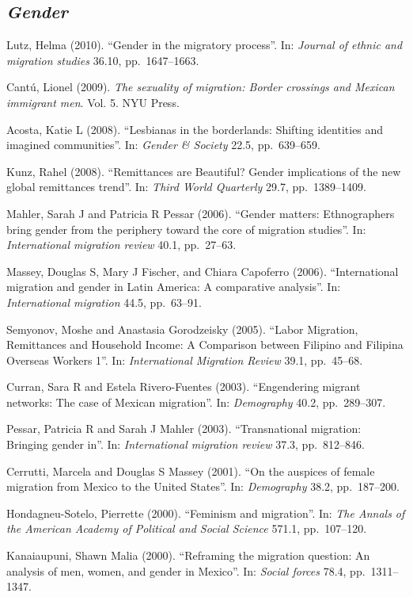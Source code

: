 \documentclass[
  12pt,
]{article}
\begin{document}
\hypertarget{gender}{%
\subsection{\texorpdfstring{\emph{Gender}}{Gender}}\label{gender}}

Lutz, Helma (2010). ``Gender in the migratory process''. In:
\emph{Journal of ethnic and migration studies} 36.10, pp.~1647--1663.

Cantú, Lionel (2009).
\emph{The sexuality of migration: Border crossings and Mexican immigrant men}.
Vol. 5. NYU Press.

Acosta, Katie L (2008). ``Lesbianas in the borderlands: Shifting
identities and imagined communities''. In: \emph{Gender \& Society}
22.5, pp.~639--659.

Kunz, Rahel (2008). ``Remittances are Beautiful? Gender implications of
the new global remittances trend''. In: \emph{Third World Quarterly}
29.7, pp.~1389--1409.

Mahler, Sarah J and Patricia R Pessar (2006). ``Gender matters:
Ethnographers bring gender from the periphery toward the core of
migration studies''. In: \emph{International migration review} 40.1,
pp.~27--63.

Massey, Douglas S, Mary J Fischer, and Chiara Capoferro (2006).
``International migration and gender in Latin America: A comparative
analysis''. In: \emph{International migration} 44.5, pp.~63--91.

Semyonov, Moshe and Anastasia Gorodzeisky (2005). ``Labor Migration,
Remittances and Household Income: A Comparison between Filipino and
Filipina Overseas Workers 1''. In: \emph{International Migration Review}
39.1, pp.~45--68.

Curran, Sara R and Estela Rivero-Fuentes (2003). ``Engendering migrant
networks: The case of Mexican migration''. In: \emph{Demography} 40.2,
pp.~289--307.

Pessar, Patricia R and Sarah J Mahler (2003). ``Transnational migration:
Bringing gender in''. In: \emph{International migration review} 37.3,
pp.~812--846.

Cerrutti, Marcela and Douglas S Massey (2001). ``On the auspices of
female migration from Mexico to the United States''. In:
\emph{Demography} 38.2, pp.~187--200.

Hondagneu-Sotelo, Pierrette (2000). ``Feminism and migration''. In:
\emph{The Annals of the American Academy of Political and Social Science}
571.1, pp.~107--120.

Kanaiaupuni, Shawn Malia (2000). ``Reframing the migration question: An
analysis of men, women, and gender in Mexico''. In: \emph{Social forces}
78.4, pp.~1311--1347.
\end{document}
